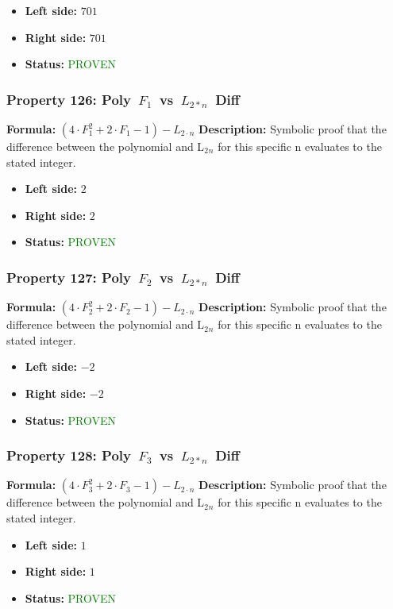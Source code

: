 \begin{itemize}
\item \textbf{Left side:} $701$
\item \textbf{Right side:} $701$
\item \textbf{Status:} \textcolor{green}{PROVEN}
\end{itemize}

\subsubsection*{Property 126: Poly~$F_{1}$~vs~$L_{{2*n}}$~Diff}
\textbf{Formula:} $(4 \cdot F_1^2+2 \cdot F_1-1) - L_{2 \cdot n}$
\textbf{Description:} Symbolic proof that the difference between the polynomial and L$_2$$_n$ for this specific n evaluates to the stated integer.

\begin{itemize}
\item \textbf{Left side:} $2$
\item \textbf{Right side:} $2$
\item \textbf{Status:} \textcolor{green}{PROVEN}
\end{itemize}

\subsubsection*{Property 127: Poly~$F_{2}$~vs~$L_{{2*n}}$~Diff}
\textbf{Formula:} $(4 \cdot F_2^2+2 \cdot F_2-1) - L_{2 \cdot n}$
\textbf{Description:} Symbolic proof that the difference between the polynomial and L$_2$$_n$ for this specific n evaluates to the stated integer.

\begin{itemize}
\item \textbf{Left side:} $-2$
\item \textbf{Right side:} $-2$
\item \textbf{Status:} \textcolor{green}{PROVEN}
\end{itemize}

\subsubsection*{Property 128: Poly~$F_{3}$~vs~$L_{{2*n}}$~Diff}
\textbf{Formula:} $(4 \cdot F_3^2+2 \cdot F_3-1) - L_{2 \cdot n}$
\textbf{Description:} Symbolic proof that the difference between the polynomial and L$_2$$_n$ for this specific n evaluates to the stated integer.

\begin{itemize}
\item \textbf{Left side:} $1$
\item \textbf{Right side:} $1$
\item \textbf{Status:} \textcolor{green}{PROVEN}
\end{itemize}

